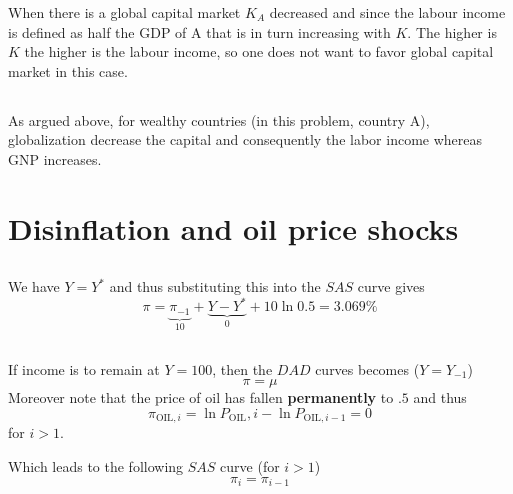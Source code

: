 \documentclass[a4paper] {scrartcl}
\begin{document}
When there is a global capital market $K_A$ decreased and since the labour income is defined as half the GDP of A that is in turn increasing with $K$. The higher is $K$ the higher is the labour income, so one does not want to favor global capital market in this case.

\subsection{ }
As argued above, for wealthy countries (in this problem, country A), globalization decrease the capital and consequently the labor income whereas GNP increases.

\section{Disinflation and oil price shocks}
\subsection{ }
 We have $Y=Y^*$ and thus substituting this into the $SAS$ curve gives
\begin{equation}
	\pi = \underbrace{\pi_{-1}}_{10}+ \underbrace{Y-Y^*}_{0}+10\ln{0.5}
	=3.069\%
\end{equation}


\subsection{ }
\label{sec:2}
If income is to remain at $Y=100$, then the $DAD$ curves becomes ($Y=Y_{-1}$)
\begin{equation}
	\pi = \mu
\end{equation}
Moreover note that the price of oil has fallen \textbf{permanently} to $.5$ and thus
\begin{equation}
	\label{eq:DADOIL}
	\pi_{\text{OIL}, i}=
	\ln{P_{\text{OIL}}, i}-\ln{P_{\text{OIL},i-1}}
	= 0
\end{equation}
for $i>1$.

Which leads to the following $SAS$ curve (for $i>1$)
\begin{equation}
	\pi_i = \pi_{i-1}
\end{equation}
\end{document}
